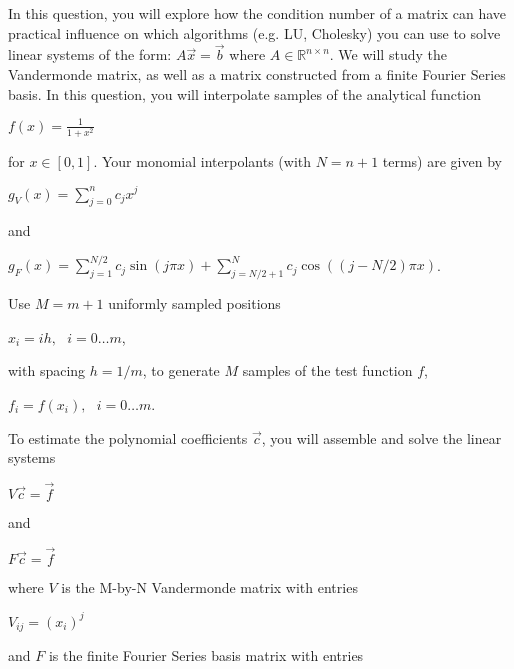 \documentclass[10pt]{article}
\begin{document}
In this question, you will explore how the condition number of a matrix can have practical influence on which algorithms (e.g. LU, Cholesky) you can use to solve linear systems of the form: $A\vec{x}=\vec{b}$ where $A\in \mathbb{R}^{n\times n}$.
We will study the Vandermonde matrix, as well as a matrix constructed from a finite Fourier Series basis.
In this question, you will interpolate samples of the analytical function

\begin{center}
$f(x)=\frac{1}{1+x^2}$    
\end{center}

for $x\in[0,1]$. Your monomial interpolants (with $N=n+1$ terms) are given by

\begin{center}
$g_V(x)=\sum_{j=0}^{n} c_j x^j$
\end{center}

and

\begin{center}
$g_{F}(x)=\sum_{j=1}^{N / 2} c_{j} \sin (j \pi x)+\sum_{j=N / 2+1}^{N} c_{j} \cos ((j-N / 2) \pi x)$.
\end{center}

Use $M=m+1$ uniformly sampled positions

\begin{center}
$x_i=ih,\text{ }i=0\dots m$,
\end{center}

with spacing $h=1/m$, to generate $M$ samples of the test function $f$,

\begin{center}
$f_i=f(x_i),\text{ }i=0\dots m$.
\end{center}

To estimate the polynomial coefficients $\vec{c}$, you will assemble and solve the linear systems

\begin{center}
$V\vec{c}=\vec{f}$
\end{center}

and

\begin{center}
$F\vec{c}=\vec{f}$
\end{center}

where $V$ is the M-by-N Vandermonde matrix with entries

\begin{center}
$V_{ij}=(x_i)^j$
\end{center}

and $F$ is the finite Fourier Series basis matrix with entries
\end{document}
